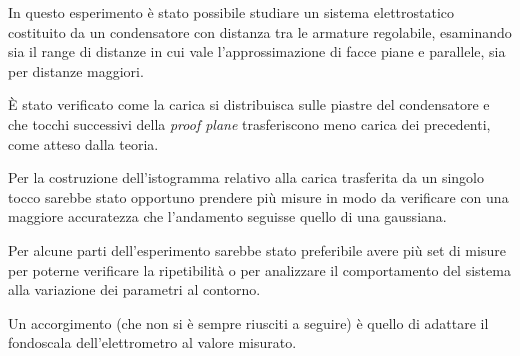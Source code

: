 {\fontsize{12}{14}\selectfont 

In questo esperimento è stato possibile studiare un sistema elettrostatico costituito da un condensatore con distanza tra le armature regolabile, esaminando sia il range di distanze in cui vale l'approssimazione di facce piane e parallele, sia per distanze maggiori. 
\par
È stato verificato come la carica si distribuisca sulle piastre del condensatore e che tocchi successivi della \emph{proof plane} trasferiscono meno carica dei precedenti, come atteso dalla teoria.
\par
Per la costruzione dell'istogramma relativo alla carica trasferita da un singolo tocco sarebbe stato opportuno prendere più misure in modo da verificare con una maggiore accuratezza che l'andamento seguisse quello di una gaussiana.
\par
Per alcune parti dell'esperimento sarebbe stato preferibile avere più set di misure per poterne verificare la ripetibilità o per analizzare il comportamento del sistema alla variazione dei parametri al contorno.
\par
Un accorgimento (che non si è sempre riusciti a seguire) è quello di adattare il fondoscala dell'elettrometro al valore misurato.
\par}
